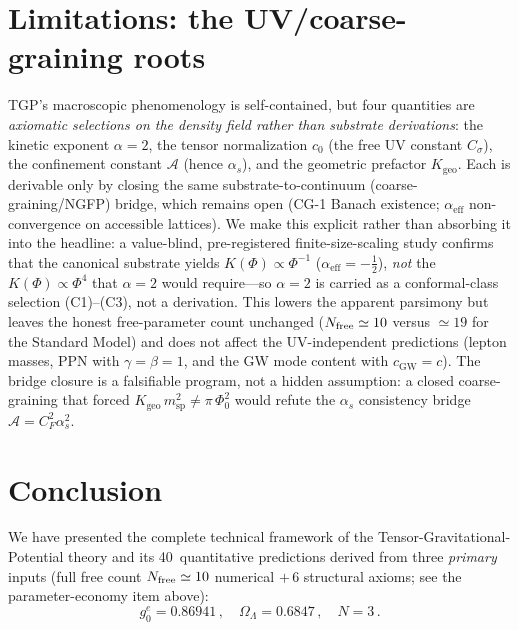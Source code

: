 \documentclass[aps,prd,twocolumn,superscriptaddress,showpacs,
  nofootinbib,floatfix,longbibliography]{revtex4-2}
\newcommand{\gone}{{g_0^e}}
\newcommand{\OL}{\Omega_\Lambda}
\newcommand{\as}{\alpha_s}
\newcommand{\PhiZero}{\Phi_0}
\begin{document}
\section{Limitations: the UV/coarse-graining roots}\label{sec:limitations}

TGP's macroscopic phenomenology is self-contained, but four quantities are
\emph{axiomatic selections on the density field rather than substrate
derivations}: the kinetic exponent $\alpha = 2$, the tensor normalization
$c_0$ (the free UV constant $C_\sigma$), the confinement constant
$\mathcal{A}$ (hence $\as$), and the geometric prefactor $K_\mathrm{geo}$.
Each is derivable only by closing the same substrate-to-continuum
(coarse-graining/NGFP) bridge, which remains open (CG-1 Banach existence;
$\alpha_\mathrm{eff}$ non-convergence on accessible lattices). We make this
explicit rather than absorbing it into the headline: a value-blind,
pre-registered finite-size-scaling study confirms that the canonical
substrate yields $K(\Phi)\propto\Phi^{-1}$ ($\alpha_\mathrm{eff} = -\tfrac12$),
\emph{not} the $K(\Phi)\propto\Phi^4$ that $\alpha = 2$ would require---so
$\alpha = 2$ is carried as a conformal-class selection (C1)--(C3), not a
derivation. This lowers the apparent parsimony but leaves the honest
free-parameter count unchanged ($N_{\rm free}\simeq 10$ versus $\simeq 19$
for the Standard Model) and does not affect the UV-independent predictions
(lepton masses, PPN with $\gamma=\beta=1$, and the GW mode content with
$c_\mathrm{GW}=c$). The bridge closure is a falsifiable program, not a
hidden assumption: a closed coarse-graining that forced
$K_\mathrm{geo}\,m_\mathrm{sp}^2\neq\pi\,\PhiZero^2$ would refute the
$\as$ consistency bridge $\mathcal{A}=C_F^2\as^2$.


\section{Conclusion}\label{sec:conclusion}

We have presented the complete technical framework of the
Tensor-Gravitational-Potential theory and its 40~quantitative predictions
derived from three \emph{primary} inputs (full free count $N_{\rm free}\simeq 10$
numerical $+\,6$ structural axioms; see the parameter-economy item above):
\begin{equation}
  \gone = 0.86941\,,\quad \OL = 0.6847\,,\quad N = 3\,.
\end{equation}
\end{document}
